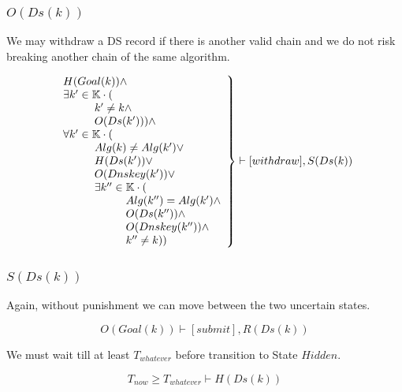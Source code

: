 \documentclass[twoside,english, a4paper]{article}
\newcommand{\mathbox}[1]{#1}
\begin{document}
\subsubsection{$O(Ds(k))$}

\mathbox{

	We may withdraw a DS record if there is another valid chain and
	we do not risk breaking another chain of the same algorithm.

	\begin{equation}
		\left.
		\begin{array}{l}
\hskip 0cm			H(Goal(k)) \wedge \\
\hskip 0cm			\exists k' \in \mathbb{K} \cdot (\\
\hskip 1cm				k' \neq k \wedge \\
\hskip 1cm				O(Ds(k'))) \wedge \\
\hskip 0cm				\forall k' \in \mathbb{K} \cdot ( \\
\hskip 1cm					Alg(k) \neq Alg(k') \vee \\
\hskip 1cm					H(Ds(k')) \vee \\
\hskip 1cm					O(Dnskey(k')) \vee \\
\hskip 1cm					\exists k'' \in \mathbb{K} \cdot (\\
\hskip 2cm 						Alg(k'')=Alg(k') \wedge \\
\hskip 2cm 						O(Ds(k'')) \wedge \\
\hskip 2cm 						O(Dnskey(k'')) \wedge \\
\hskip 2cm 						k'' \neq k))
		\end{array}
		\right\} \vdash [withdraw], S(Ds(k)) \\
	\end{equation}
}

\subsubsection{$S(Ds(k))$}

\mathbox{

	Again, without punishment we can move between the two uncertain 
	states.

	\begin{equation}
			O(Goal(k)) \vdash [submit], R(Ds(k)) 
	\end{equation}

	We must wait till at least $T_{whatever}$ before transition to State 
	$Hidden$.
	
	\begin{equation}
			T_{now} \geq T_{whatever} \vdash H(Ds(k))
	\end{equation}
}
\end{document}
